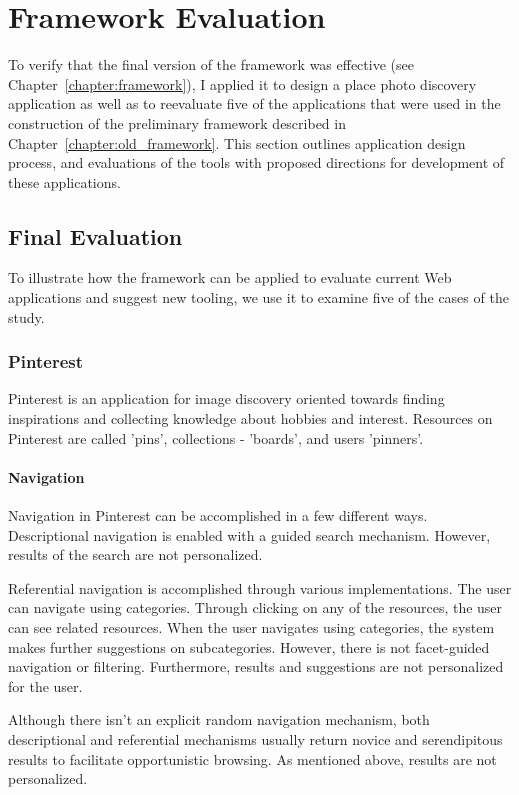 \chapter{Framework Evaluation}
\label{chapter:evaluation}

To verify that the final version of the framework was effective (see Chapter~\ref{chapter:framework}), I applied it to design a place photo discovery application as well as to reevaluate five of the applications that were used in the construction of the preliminary framework described in Chapter~\ref{chapter:old_framework}. This section outlines application design process, and evaluations of the tools with proposed directions for development of these applications. 



{\section{Final Evaluation}
To illustrate how the framework can be applied to evaluate current Web applications and suggest new tooling, we use it to examine five of the cases of the study.

{\subsection{Pinterest}
Pinterest is an application for image discovery oriented towards finding inspirations and collecting knowledge about hobbies and interest. Resources on Pinterest are called 'pins', collections - 'boards', and users 'pinners'. 

{\subsubsection{Navigation}
Navigation in Pinterest can be accomplished in a few different ways. Descriptional navigation is enabled with a guided search mechanism. However, results of the search are not personalized. 

Referential navigation is accomplished through various implementations. The user can navigate using categories. Through clicking on any of the resources, the user can see related resources. When the user navigates using categories, the system makes further suggestions on subcategories. However, there is not facet-guided navigation or filtering. Furthermore, results and suggestions are not personalized for the user. 

Although there isn't an explicit random navigation mechanism, both descriptional and referential mechanisms usually return novice and serendipitous results to facilitate opportunistic browsing. As mentioned above, results are not personalized.

}}}
